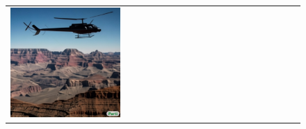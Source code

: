 \begin{figure}[ht!]
\begin{adjustwidth}{-0.8in}{-0.5in}
\begin{tabular}{cccccccccccccccccccc}
\multicolumn{2}{c}{\includegraphics[width=\threebythreecolwidth\textwidth]{figures/cherries/grand_canyon3.jpg}} &&


\end{tabular}
\end{adjustwidth}
\end{figure}
